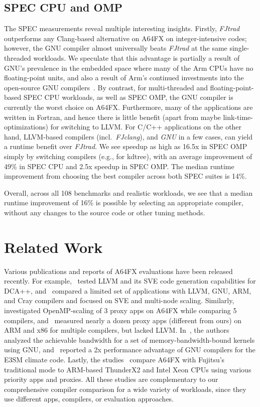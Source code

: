 \documentclass[conference,compsoc]{IEEEtran}
\begin{document}
\subsection{SPEC CPU and OMP}\label{sec:eval:spec}
The SPEC measurements reveal multiple interesting insights. Firstly, \textit{FJtrad} outperforms
any Clang-based alternative on A64FX on integer-intensive codes; however, the GNU compiler almost
universally beats \textit{FJtrad} at the same single-threaded workloads. We speculate that this
advantage is partially a result of GNU's prevalence in the embedded space where many of the Arm CPUs have no floating-point
units, and also a result of Arm's continued investments into the open-source GNU compilers~\cite{christina_blog_2020}.
By contrast, for multi-threaded and floating-point-based SPEC CPU workloads, as well as SPEC OMP,
the GNU compiler is currently the worst choice on A64FX. Furthermore, many of the applications
are written in Fortran, and hence there is little benefit (apart from maybe link-time-optimizations)
for switching to LLVM. For C/C++ applications on the other hand, LLVM-based compilers (incl.~\textit{FJclang}),
and \textit{GNU} in a few cases, can yield a runtime benefit over \textit{FJtrad}. We see speedup as high as
16.5x in SPEC OMP simply by switching compilers (e.g., for kdtree), with an average improvement of 49\% in SPEC
CPU and 2.5x speedup in SPEC OMP. The median runtime improvement from choosing the best compiler across
both SPEC suites is 14\%.

Overall, across all 108 benchmarks and realistic workloads, we see that a median runtime improvement of 16\% is possible by
selecting an appropriate compiler, without any changes to the source code or other tuning methods.


\section{Related Work}\label{sec:relwork}
Various publications and reports of A64FX evaluations have been released recently. For
example,~\cite{huber_case_2021} tested LLVM and its SVE code generation capabilities for DCA++,
and~\cite{burford_ookami_2021} compared a limited set of applications with LLVM, GNU, ARM, and Cray
compilers and focused on SVE and multi-node scaling. Similarly,~\cite{michalowicz_comparing_2021}
investigated OpenMP-scaling of 3 proxy apps on A64FX while comparing 5 compilers,
and~\cite{poenaru_evaluation_2021} measured nearly a dozen proxy apps (different from ours) on ARM
and x86 for multiple compilers, but lacked LLVM. In~\cite{alappat_performance_2020}, the authors analyzed
the achievable bandwidth for a set of memory-bandwidth-bound kernels using GNU, and~\cite{sreepathi_e3sm_2021}
reported a 2x performance advantage of GNU compilers for the E3SM climate code. 
Lastly, the studies~\cite{jackson_investigating_2020,odajima_preliminary_2020,sato_co-design_2020}
compare A64FX with Fujitsu's traditional mode to ARM-based ThunderX2 and Intel Xeon CPUs using
various priority apps and proxies.
All these studies are complementary to our comprehensive compiler comparison for a wide
variety of workloads, since they use different apps, compilers, or evaluation approaches.
\end{document}

